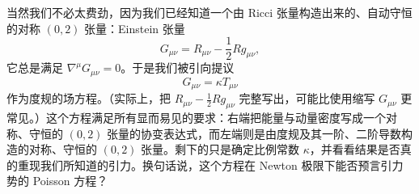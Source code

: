 当然我们不必太费劲，因为我们已经知道一个由 Ricci 张量构造出来的、自动守恒的对称 $(0,2)$ 张量：Einstein 张量
\begin{equation*}
G_{\mu\nu} = R_{\mu\nu} - \frac{1}{2}Rg_{\mu\nu},
\tag{4.29}
\end{equation*}
它总是满足 $\nabla^\mu G_{\mu\nu}=0$。于是我们被引向提议
\begin{equation*}
G_{\mu\nu} = \kappa T_{\mu\nu}
\tag{4.30}
\end{equation*}
作为度规的场方程。（实际上，把 $R_{\mu\nu}-\frac{1}{2}Rg_{\mu\nu}$ 完整写出，可能比使用缩写 $G_{\mu\nu}$ 更常见。）这个方程满足所有显而易见的要求：右端把能量与动量密度写成一个对称、守恒的 $(0,2)$ 张量的协变表达式，而左端则是由度规及其一阶、二阶导数构造的对称、守恒的 $(0,2)$ 张量。剩下的只是确定比例常数 $\kappa$，并看看结果是否真的重现我们所知道的引力。换句话说，这个方程在 Newton 极限下能否预言引力势的 Poisson 方程？

